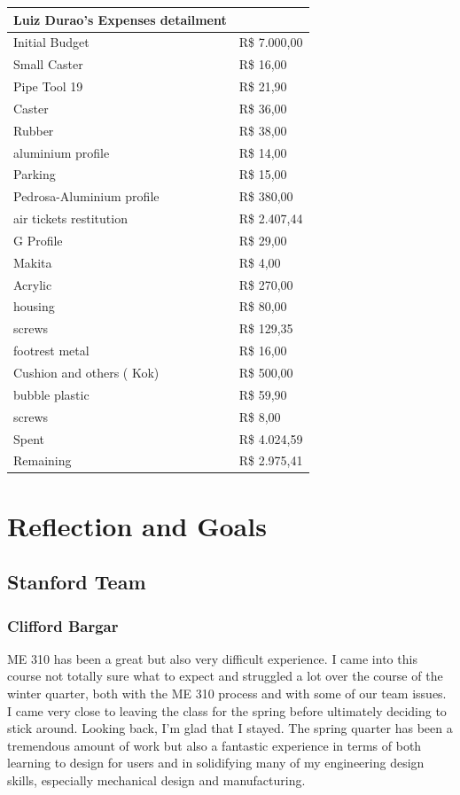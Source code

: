 \begin{tabular}{ l | l }
\hline
Luiz Durao's Expenses detailment \\	
\hline\hline	
Initial Budget &	 R\$ 7.000,00 \\
\hline
Small Caster	& R\$ 16,00 \\
Pipe Tool 19	& R\$ 21,90 \\
Caster	& R\$ 36,00 \\
Rubber	& R\$ 38,00 \\
aluminium profile &	 R\$ 14,00 \\
Parking	&  R\$ 15,00 \\
Pedrosa-Aluminium profile &	 R\$ 380,00 \\
air tickets restitution	&  R\$ 2.407,44 \\
 G Profile	 &  R\$ 29,00 \\
 Makita	 & R\$ 4,00 \\
Acrylic	 & R\$ 270,00 \\
housing	& R\$ 80,00 \\
screws	& R\$ 129,35 \\
footrest metal	& R\$ 16,00 \\
Cushion and others ( Kok)	& R\$ 500,00 \\
bubble plastic	& R\$ 59,90 \\
screws	& R\$ 8,00 \\
\hline\hline
Spent & 	R\$ 4.024,59\\
\hline
Remaining &	R\$ 2.975,41\\
\hline

\end{tabular}
 
\section{Reflection and Goals}

\subsection{Stanford Team}

\subsubsection{Clifford Bargar}

ME 310 has been a great but also very difficult experience. I came into this course not totally sure what to expect and struggled a lot over the course of the winter quarter, both with the ME 310 process and with some of our team issues. I came very close to leaving the class for the spring before ultimately deciding to stick around. Looking back, I'm glad that I stayed. The spring quarter has been a tremendous amount of work but also a fantastic experience in terms of both learning to design for users and in solidifying many of my engineering design skills, especially mechanical design and manufacturing.


